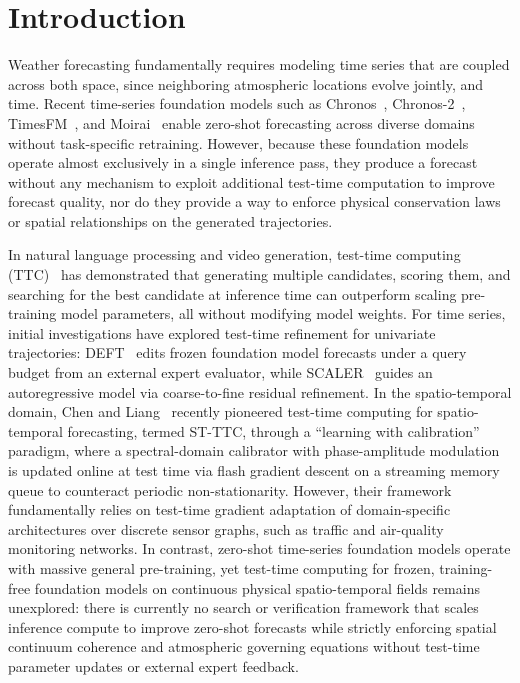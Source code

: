 \documentclass[preprint,12pt]{elsarticle}
\begin{document}
\section{Introduction}
\label{intro}

Weather forecasting fundamentally requires modeling time series that are coupled across both space, since neighboring atmospheric locations evolve jointly, and time. Recent time-series foundation models such as Chronos~\citep{ansari2024chronos}, Chronos-2~\citep{ansari2025chronos2}, TimesFM~\citep{das2024timesfm}, and Moirai~\citep{woo2024moirai} enable zero-shot forecasting across diverse domains without task-specific retraining. However, because these foundation models operate almost exclusively in a single inference pass, they produce a forecast without any mechanism to exploit additional test-time computation to improve forecast quality, nor do they provide a way to enforce physical conservation laws or spatial relationships on the generated trajectories.

In natural language processing and video generation, test-time computing (TTC)~\citep{snell2024scaling, liu2025videot1} has demonstrated that generating multiple candidates, scoring them, and searching for the best candidate at inference time can outperform scaling pre-training model parameters, all without modifying model weights. For time series, initial investigations have explored test-time refinement for univariate trajectories: DEFT~\citep{le2026deft} edits frozen foundation model forecasts under a query budget from an external expert evaluator, while SCALER~\citep{le2026scaler} guides an autoregressive model via coarse-to-fine residual refinement. In the spatio-temporal domain, Chen and Liang~\citep{chen2025stttc} recently pioneered test-time computing for spatio-temporal forecasting, termed ST-TTC, through a ``learning with calibration'' paradigm, where a spectral-domain calibrator with phase-amplitude modulation is updated online at test time via flash gradient descent on a streaming memory queue to counteract periodic non-stationarity. However, their framework fundamentally relies on test-time gradient adaptation of domain-specific architectures over discrete sensor graphs, such as traffic and air-quality monitoring networks. In contrast, zero-shot time-series foundation models operate with massive general pre-training, yet test-time computing for frozen, training-free foundation models on continuous physical spatio-temporal fields remains unexplored: there is currently no search or verification framework that scales inference compute to improve zero-shot forecasts while strictly enforcing spatial continuum coherence and atmospheric governing equations without test-time parameter updates or external expert feedback.
\end{document}
